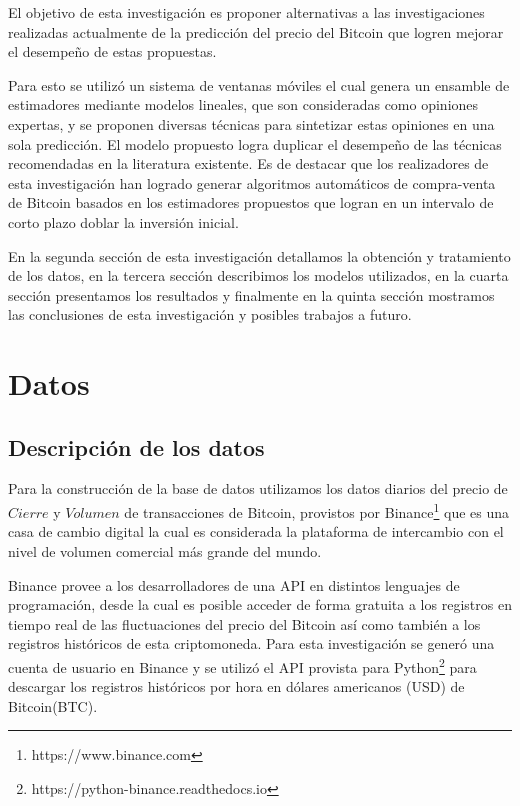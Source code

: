 \documentclass[a4paper,12pt,twocolumn]{article}
\begin{document}
El objetivo de esta investigación es proponer alternativas a las investigaciones realizadas actualmente de la predicción del precio del Bitcoin que logren mejorar el desempeño de estas propuestas. 

Para esto se utilizó un sistema de ventanas móviles el cual genera un ensamble de estimadores mediante modelos lineales, que son consideradas como opiniones expertas, y se proponen diversas técnicas para sintetizar estas opiniones en una sola predicción. El modelo propuesto logra duplicar el desempeño de las técnicas recomendadas en la literatura existente. Es de destacar que los realizadores de esta investigación han logrado generar algoritmos automáticos de compra-venta de Bitcoin  basados en los estimadores propuestos que logran en un  intervalo de corto plazo doblar la inversión inicial.  


En la segunda sección de esta investigación detallamos la obtención y tratamiento de los datos, en la tercera sección describimos los modelos utilizados, en la cuarta sección presentamos los resultados y finalmente en la quinta sección mostramos las conclusiones de esta investigación y posibles trabajos a futuro.



\section{Datos}
\subsection{Descripción de los datos}

Para la construcción de la base de datos utilizamos los datos diarios del precio de  $Cierre$ y $Volumen$ de transacciones de Bitcoin, provistos por Binance\footnote{https://www.binance.com} que es una casa de cambio digital la cual es considerada la plataforma de intercambio con el nivel de volumen comercial más grande del mundo. 

Binance provee a los desarrolladores de una API en distintos lenguajes de programación, desde la cual es posible acceder de forma gratuita a los registros en tiempo real de las fluctuaciones del precio del Bitcoin así como también a los registros históricos de esta criptomoneda. Para esta investigación se generó una cuenta de usuario en Binance y se utilizó el API provista para Python\footnote{https://python-binance.readthedocs.io} para descargar los registros históricos por hora en dólares americanos (USD) de Bitcoin(BTC). 
\end{document}
